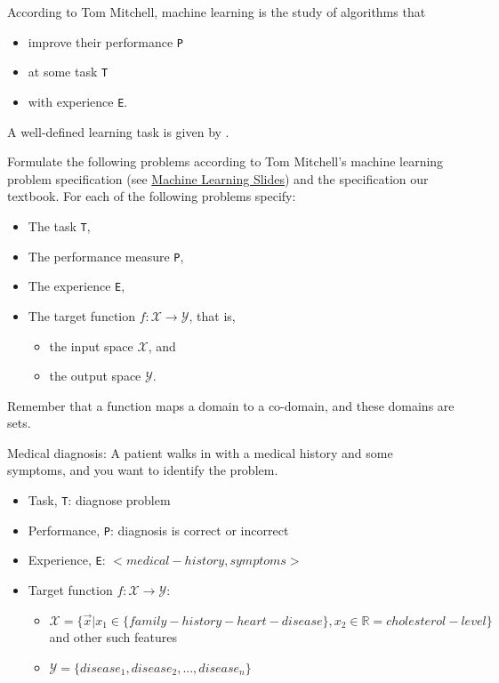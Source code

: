\begin{questions}

According to Tom Mitchell, machine learning is the study of algorithms that

\begin{itemize}
\item improve their performance {\tt P}
\item at some task {\tt T}
\item with experience {\tt E}.
\end{itemize}

A well-defined learning task is given by {\tt <P, T, E>}.

Formulate the following problems according to Tom Mitchell's machine learning problem specification (see \href{https://drcs.codes/ai/slides/machine-learning.pdf}{Machine Learning Slides}) and the specification our textbook. For each of the following problems specify:

\begin{itemize}
\item The task {\tt T},
\item The performance measure {\tt P},
\item The experience {\tt E},
\item The target function $f: \mathcal{X} \rightarrow \mathcal{Y}$, that is,
\begin{itemize}
\item the input space $\mathcal{X}$, and
\item the output space $\mathcal{Y}$.
\end{itemize}
\end{itemize}

Remember that a function maps a domain to a co-domain, and these domains are sets.

\question Medical diagnosis: A patient walks in with a medical history and some symptoms, and you want to identify the problem.

\ifprintanswers
\begin{solution}
\begin{itemize}
\item Task, {\tt T}: diagnose problem
\item Performance, {\tt P}: diagnosis is correct or incorrect
\item Experience, {\tt E}: $<medical-history, symptoms>$
\item Target function $f: \mathcal{X} \rightarrow \mathcal{Y}$:
\begin{itemize}
\item $\mathcal{X} = \{\vec{x} \vert x_1 \in \{family-history-heart-disease\}, x_2 \in \mathbb{R} = cholesterol-level \}$ and other such features
\item $\mathcal{Y} = \{disease_1, disease_2, ..., disease_n \}$
\end{itemize}
\end{itemize}
\end{solution}
\else
\vspace{3in}
\fi



\end{questions}

